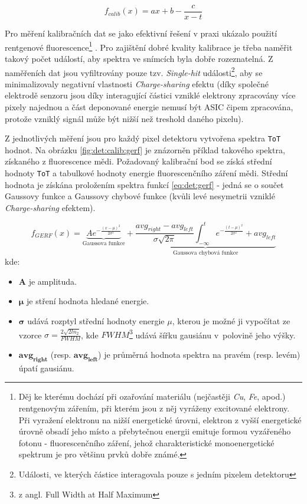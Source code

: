 \begin{equation}\label{eq:det:energyCalib}
	f_{calib}(x) = ax + b - \frac{c}{x-t}
\end{equation}

Pro měření kalibračních dat se jako efektivní řešení v praxi ukázalo použití rentgenové fluorescence\footnote{Děj ke kterému dochází při ozařování materiálu (nejčastěji \textit{Cu}, \textit{Fe},  apod.) rentgenovým zářením, při kterém jsou z něj vyráženy excitované elektrony. Při vyražení elektronu na nižší energetické úrovni, elektron z vyšší energetické úrovně obsadí jeho místo a přebytečnou energii emituje formou vyzářeného fotonu - fluorescenčního záření, jehož charakteristické monoenergetické spektrum je pro většinu prvků dobře známé.} \cite{Jakubek-radiography_and_charge_sharing}. Pro zajištění dobré kvality kalibrace je třeba naměřit takový počet událostí, aby spektra ve snímcích byla dobře rozeznatelná. Z naměřeních dat jsou vyfiltrovány pouze tzv. \textit{Single-hit} události\footnote{Události, ve kterých částice interagovala pouze s jedním pixelem detektoru}, aby se minimalizovaly negativní vlastnosti \textit{Charge-sharing} efektu (díky společné elektrodě senzoru jsou díky interagující částici vzniklé elektrony zpracovány více pixely najednou a část deponované energie nemusí být ASIC čipem zpracována, protože vzniklý signál může být nižší než treshold daného pixelu).

Z jednotlivých měření jsou pro každý pixel detektoru vytvořena spektra \texttt{ToT} hodnot. Na obrázku \ref{fig:det:calib:gerf} je znázorněn příklad takového spektra, získaného z fluorescence mědi. Požadovaný kalibrační bod se získá střední hodnoty \texttt{ToT} a tabulkové hodnoty energie fluorescenčního záření mědi. Střední hodnota je získána proložením spektra funkcí \ref{eq:det:gerf} - jedná se o součet Gaussovy funkce a Gaussovy chybové funkce (kvůli levé nesymetrii vzniklé \textit{Charge-sharing} efektem).

\begin{equation}\label{eq:det:gerf}
	f_{GERF}(x) = \underbrace{Ae^{ -\frac{(x-\mu)^2}{2\sigma^2} }}_{\text{Gaussova funkce}} +
	\underbrace{ \frac{avg_{right} - avg_{left}}{\sigma\sqrt{2\pi}} \int_{-\infty}^t e^{ -\frac{(t-\mu)^2}{2\sigma^2} } + avg_{left}}_{\text{Gaussova chybová funkce}}
\end{equation}
kde:
\begin{changemargin}{1.5cm}{1cm} 
	\begin{itemize}
		\item $\mathbf{A}$ je amplituda.
		\item $\mathbf{\mu}$ je stření hodnota hledané energie.
		\item $\mathbf{\sigma}$ udává rozptyl střední hodnoty energie $\mu$, kterou je možné ji vypočítat ze vzorce 
			$\sigma = \frac{2\sqrt{2ln_2}}{FWHM}$, kde $FWHM$\footnote{z angl. Full Width at Half Maximum} udává šířku gausiánu v~polovině jeho výšky.
		\item $\mathbf{avg_{right}}$ (resp. $\mathbf{avg_{left}}$) je průměrná hodnota spektra na pravém (resp. levém) úpatí gausiánu.
	\end{itemize}
\end{changemargin}

